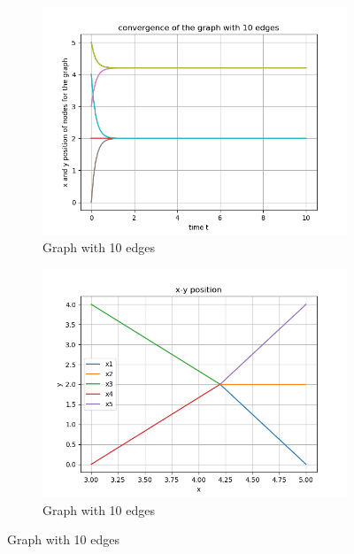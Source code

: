 \documentclass{article}
\begin{document}
\begin{problem}
\begin{figure}
\begin{subfigure}{0.4\textwidth}
            \includegraphics[width=\textwidth]{./img/p3_edge_10_1.png}
            \caption{Graph with 10 edges}
        \end{subfigure}
        \begin{subfigure}{0.4\textwidth}
            \includegraphics[width=\textwidth]{./img/p3_edge_10_2.png}
            \caption{Graph with 10 edges}
        \end{subfigure}


\end{figure}
\end{problem}
\end{document}
